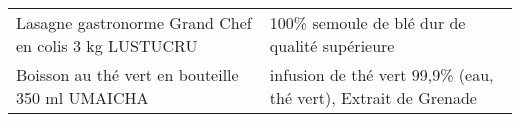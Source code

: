\begin{longtable}{p{5cm}p{10cm}}
                                                    Lasagne gastronorme Grand Chef en colis 3 kg LUSTUCRU &                                                                                                                                                                                                                                                                                                                                                                                                                                                                                                                                                                                                                                                                                                                                                                                                                                                                                                                                                                                            100\% semoule de blé dur de qualité supérieure \\
                                                          Boisson au thé vert en bouteille 350 ml UMAICHA &                                                                                                                                                                                                                                                                                                                                                                                                                                                                                                                                                                                                                                                                                                                                                                                                                                                                                                                                                                           infusion de thé vert 99,9\% (eau, thé vert), Extrait de Grenade \\

\end{longtable}
